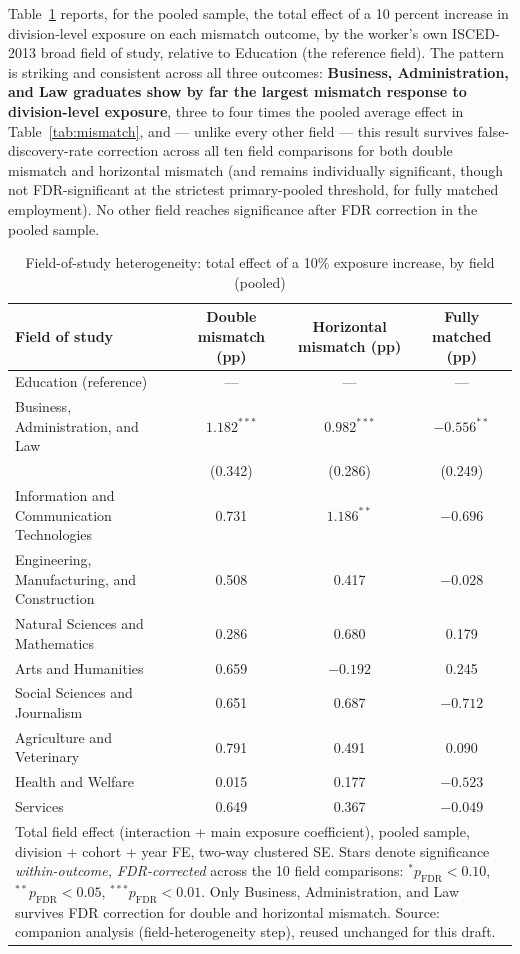 \documentclass[11pt]{article}
\begin{document}
Table~\ref{tab:field} reports, for the pooled sample, the total effect of a 10 percent increase in division-level exposure on each mismatch outcome, by the worker's own ISCED-2013 broad field of study, relative to Education (the reference field). The pattern is striking and consistent across all three outcomes: \textbf{Business, Administration, and Law graduates show by far the largest mismatch response to division-level exposure}, three to four times the pooled average effect in Table~\ref{tab:mismatch}, and --- unlike every other field --- this result survives false-discovery-rate correction across all ten field comparisons for both double mismatch and horizontal mismatch (and remains individually significant, though not FDR-significant at the strictest primary-pooled threshold, for fully matched employment). No other field reaches significance after FDR correction in the pooled sample.

\begin{table}[htbp]
\centering
\caption{Field-of-study heterogeneity: total effect of a 10\% exposure increase, by field (pooled)}
\label{tab:field}
\small
\begin{tabular}{p{4.6cm}ccc}
\toprule
Field of study & Double mismatch (pp) & Horizontal mismatch (pp) & Fully matched (pp) \\
\midrule
Education (reference) & --- & --- & --- \\
Business, Administration, and Law & $1.182^{***}$ & $0.982^{***}$ & $-0.556^{**}$ \\
 & (0.342) & (0.286) & (0.249) \\
Information and Communication Technologies & 0.731 & $1.186^{**}$ & $-0.696$ \\
Engineering, Manufacturing, and Construction & 0.508 & 0.417 & $-0.028$ \\
Natural Sciences and Mathematics & 0.286 & 0.680 & 0.179 \\
Arts and Humanities & 0.659 & $-0.192$ & 0.245 \\
Social Sciences and Journalism & 0.651 & 0.687 & $-0.712$ \\
Agriculture and Veterinary & 0.791 & 0.491 & 0.090 \\
Health and Welfare & 0.015 & 0.177 & $-0.523$ \\
Services & 0.649 & 0.367 & $-0.049$ \\
\bottomrule
\multicolumn{4}{p{0.95\textwidth}}{\footnotesize Total field effect (interaction + main exposure coefficient), pooled sample, division + cohort + year FE, two-way clustered SE. Stars denote significance \emph{within-outcome, FDR-corrected} across the 10 field comparisons: $^{*}p_{\text{FDR}}<0.10$, $^{**}p_{\text{FDR}}<0.05$, $^{***}p_{\text{FDR}}<0.01$. Only Business, Administration, and Law survives FDR correction for double and horizontal mismatch. Source: companion analysis (field-heterogeneity step), reused unchanged for this draft.}
\end{tabular}
\end{table}
\end{document}
